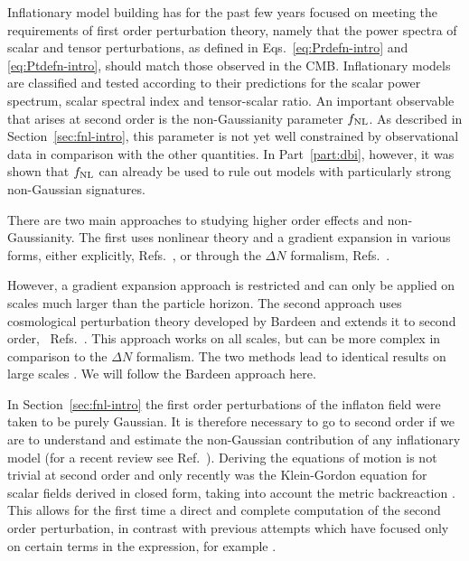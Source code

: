 Inflationary model building has for the past few years focused on
meeting the requirements of first order perturbation theory, namely
that the power spectra of scalar and tensor perturbations, as defined in
Eqs.~\eqref{eq:Prdefn-intro} and \eqref{eq:Ptdefn-intro}, should match
those observed in the CMB.  Inflationary
models are classified and tested according to their predictions for the scalar power
spectrum, scalar spectral index and tensor-scalar ratio. 
An important observable that arises at second order is the non-Gaussianity
parameter $f_{\mathrm{NL}}$. As described in Section~\ref{sec:fnl-intro}, this parameter is
not yet well constrained by observational data in comparison with the
other quantities. In Part~\ref{part:dbi}, however, it was shown that $f_{\mathrm{NL}}$ can
already be used to rule out models with particularly strong non-Gaussian signatures.


There are two main approaches to studying higher order effects and
non-Gaussianity.  
The first uses nonlinear theory and a gradient expansion in various
forms, either explicitly, \eg
Refs.~\cite{Salopek:1990jq,Rigopoulos:2005xx}, or through the
$\Delta N$ formalism, \eg
Refs.~\cite{Starobinsky:1982ee,
Starobinsky:1986fxa, Sasaki:1995aw, Sasaki:1998ug,
Lyth:2004gb,Lyth:2005fi,Langlois:2006vv}.

However, a gradient expansion approach is restricted and can only be applied on
scales much larger than the particle horizon.  
The
second approach uses cosmological perturbation theory developed by Bardeen
\cite{Bardeen:1980kt} and extends it to second order,
\eg~Refs.~\cite{Tomita:1967,Mukhanov:1996ak,Bruni:1996im,
  Acquaviva:2002ud,Nakamura:2003wk,Noh:2004bc,
  Bernardeau:2002jy,Maldacena:2002vr,
  Finelli:2003bp,Bartolo:2004if,Enqvist:2004bk,Lyth:2005du,Seery:2005gb,
  Malik:2003mv, Barnaby:2006cq}\footnotemark.
%
This approach works on all scales, but can be more complex in comparison to the
$\Delta N$ formalism. The two methods lead to identical results on large scales
\cite{Malik:2005cy}. We
will follow the Bardeen approach here.


In Section~\ref{sec:fnl-intro} the first order perturbations of the inflaton field
were taken to be purely Gaussian. It is therefore 
necessary to go to second order if we are to understand and estimate
the non-Gaussian contribution of any inflationary model (for a recent
review see Ref.~\cite{Malik:2008im}). Deriving the equations of motion is
not trivial at second order and only recently was the Klein-Gordon
equation for scalar fields derived in closed form, taking into account the
metric backreaction \cite{Malik:2006ir}. This allows for the first time
a direct and complete computation of the second order perturbation, in
contrast with previous attempts which have focused only on certain
terms in the expression, for example .


